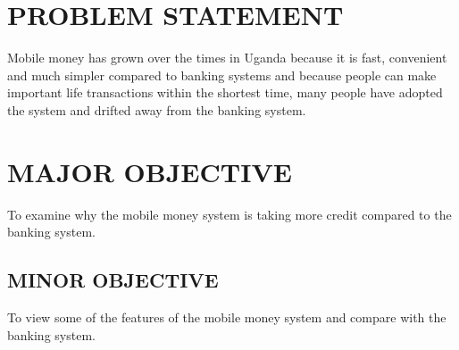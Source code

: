 \documentclass[12pt,]{article}
\begin{document}


\section{PROBLEM STATEMENT}
Mobile money has grown over the times in Uganda because it is fast, convenient and much simpler compared to banking systems and because people can make important life transactions within the shortest time, many people have adopted the system and drifted away from the banking system.

\section{MAJOR OBJECTIVE}
To examine why the mobile money system is taking more credit compared to the banking system.

\subsection{MINOR OBJECTIVE}
	To view some of the features of the mobile money system and compare with the banking system.
\end{document}
